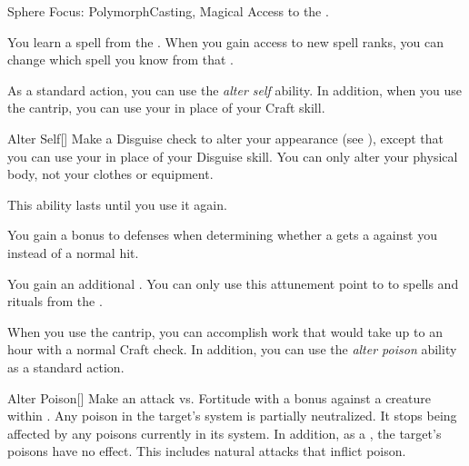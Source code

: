     \begin{feat}{Sphere Focus: Polymorph}{Casting, Magical}
        \featpre Access to the  .

         You learn a spell from the  .
        When you gain access to new spell ranks, you can change which spell you know from that .

         As a standard action, you can use the \textit{alter self} ability.
        In addition, when you use the  cantrip, you can use your  in place of your Craft skill.
        \begin{freeability}{Alter Self}[]
            Make a Disguise check to alter your appearance (see ), except that you can use your  in place of your Disguise skill.
            You can only alter your physical body, not your clothes or equipment.

            This ability lasts until you use it again.
        \end{freeability}

         You gain a  bonus to defenses when determining whether a  gets a  against you instead of a normal hit.

         You gain an additional .
        You can only use this attunement point to  to spells and rituals from the  .

         When you use the  cantrip, you can accomplish work that would take up to an hour with a normal Craft check.
        In addition, you can use the \textit{alter poison} ability as a standard action.
        \begin{freeability}{Alter Poison}[]
            Make an attack vs. Fortitude with a   bonus against a creature within \shortrange.
            \hit Any poison in the target's system is partially neutralized.
            It stops being affected by any poisons currently in its system.
            In addition, as a , the target's  poisons have no effect.
            This includes natural attacks that inflict poison.


\end{freeability}
\end{feat}
